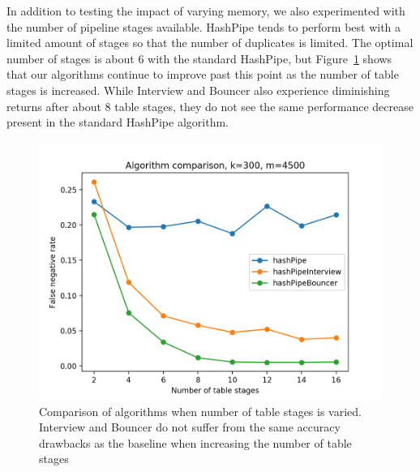 In addition to testing the impact of varying memory, we also experimented with the number of pipeline stages available. HashPipe tends to perform best with a limited amount of stages so that the number of duplicates is limited. The optimal number of stages is about 6 with the standard HashPipe, but Figure~\ref{fig:stageComparison} shows that our algorithms continue to improve past this point as the number of table stages is increased. While Interview and Bouncer also experience diminishing returns after about 8 table stages, they do not see the same performance decrease present in the standard HashPipe algorithm.
\begin{figure}[!htb]
  \centering
    \includegraphics[scale=0.5]{stageComparison}
     \caption{Comparison of algorithms when number of table stages is varied. Interview and Bouncer do not suffer from the same accuracy drawbacks as the baseline when increasing the number of table stages}
     \label{fig:stageComparison}
\end{figure}
